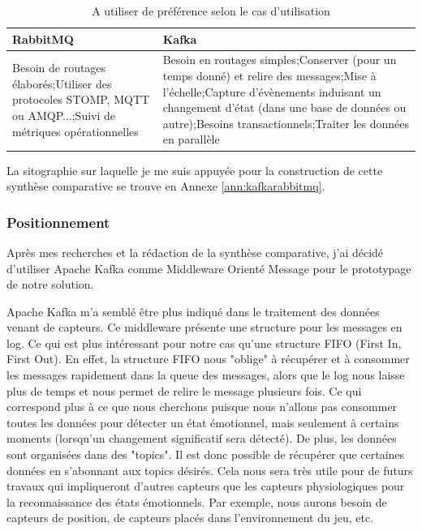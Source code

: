 \documentclass[11pt]{article}
\begin{document}
			\begin{table}[hp]
				\begin{tabular}{|p{7.5cm}|p{7.5cm}|}
				\hline
				\rowcolor{lightgray} RabbitMQ & Kafka\\\hline
				Besoin de routages élaborés;\newline Utiliser des protocoles STOMP, MQTT ou AMQP...;\newline Suivi de métriques opérationnelles & Besoin en routages simples;\newline Conserver (pour un temps donné) et relire des messages;\newline Mise à l’échelle;\newline Capture d’évènements induisant un changement d’état (dans une base de données ou autre);\newline Besoins transactionnels;\newline Traiter les données en parallèle\\\hline
				\end{tabular}
				\caption{A utiliser de préférence selon le cas d'utilisation}
				\label{tab:comparatifpref}
			\end{table}
			La sitographie sur laquelle je me suis appuyée pour la construction de cette synthèse comparative se trouve en Annexe \ref{ann:kafkarabbitmq}.
		\subsubsection{Positionnement}\label{sec:position}
			Après mes recherches et la rédaction de la synthèse comparative, j'ai décidé d'utiliser Apache Kafka comme Middleware Orienté Message pour le prototypage de notre solution.\par
			Apache Kafka m'a semblé être plus indiqué dans le traitement des données venant de capteurs.
			Ce middleware présente une structure pour les messages en log.
			Ce qui est plus intéressant pour notre cas qu'une structure FIFO (First In, First Out).
			En effet, la structure FIFO nous "oblige" à récupérer et à consommer les messages rapidement dans la queue des messages, alors que le log nous laisse plus de temps et nous permet de relire le message plusieurs fois.
			Ce qui correspond plus à ce que nous cherchons puisque nous n'allons pas consommer toutes les données pour détecter un état émotionnel, mais seulement à certains moments (lorsqu'un changement significatif sera détecté).
			De plus, les données sont organisées dans des "topics". 
			Il est donc possible de récupérer que certaines données en s'abonnant aux topics désirés.
			Cela nous sera très utile pour de futurs travaux qui impliqueront d'autres capteurs que les capteurs physiologiques pour la reconnaissance des états émotionnels.
			Par exemple, nous aurons besoin de capteurs de position, de capteurs placés dans l'environnement du jeu, etc.
\end{document}
